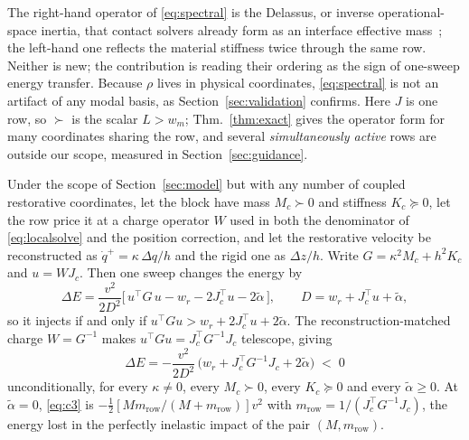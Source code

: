 \documentclass[sigconf,screen,review,anonymous]{acmart}
\newcommand{\Rr}{w_{r}}
\newcommand{\wm}{w_{m}}
\theoremstyle{acmdefinition}
\begin{document}
The right-hand operator of \eqref{eq:spectral} is the Delassus, or inverse
operational-space inertia, that contact solvers already form as an interface
effective mass~\citep{andrews2019schur,peiret2018interface}; the left-hand one
reflects the material stiffness twice through the same row. Neither is new; the
contribution is reading their ordering as the sign of one-sweep energy transfer.
Because $\rho$ lives in physical coordinates, \eqref{eq:spectral} is not an
artifact of any modal basis, as Section~\ref{sec:validation} confirms.
Here $J$ is one row, so $\succ$ is the scalar $L > \wm$;
Thm.~\ref{thm:exact} gives the operator form for many coordinates sharing the
row, and several \emph{simultaneously active} rows are outside our scope,
measured in Section~\ref{sec:guidance}.

\begin{theorem}
\label{thm:exact}
Under the scope of Section~\ref{sec:model} but with any number of coupled
restorative coordinates, let the block have mass $M_c \succ 0$ and stiffness
$K_c \succeq 0$, let the row price it at a charge operator $W$ used in both the
denominator of \eqref{eq:localsolve} and the position correction, and let the
restorative velocity be reconstructed as $\dot q^{+} = \kappa\,\Delta q/h$ and
the rigid one as $\Delta z/h$. Write
$G = \kappa^2 M_c + h^2 K_c$ and $u = W J_c$. Then one sweep changes the energy by
\begin{equation}
\Delta E = \frac{v^2}{2 D^2}\big[\,u^{\top} G\, u - \Rr
  - 2 J_c^{\top} u - 2\tilde\alpha\,\big],
\qquad D = \Rr + J_c^{\top} u + \tilde\alpha,
\label{eq:c3general}
\end{equation}
so it injects if and only if $u^{\top} G u > \Rr + 2 J_c^{\top} u +
2\tilde\alpha$. The reconstruction-matched charge $W = G^{-1}$ makes
$u^{\top} G u = J_c^{\top} G^{-1} J_c$ telescope, giving
\begin{equation}
\Delta E = -\frac{v^2}{2 D^2}\,\big(\Rr + J_c^{\top} G^{-1} J_c
  + 2\tilde\alpha\big) \;<\; 0
\label{eq:c3}
\end{equation}
unconditionally, for every $\kappa \neq 0$, every $M_c \succ 0$, every
$K_c \succeq 0$ and every $\tilde\alpha \ge 0$. At $\tilde\alpha = 0$,
\eqref{eq:c3} is $-\tfrac12 [M m_{\mathrm{row}}/(M + m_{\mathrm{row}})] v^2$
with $m_{\mathrm{row}} = 1/(J_c^{\top} G^{-1} J_c)$, the energy lost in the
perfectly inelastic impact of the pair $(M, m_{\mathrm{row}})$.
\end{theorem}
\end{document}
